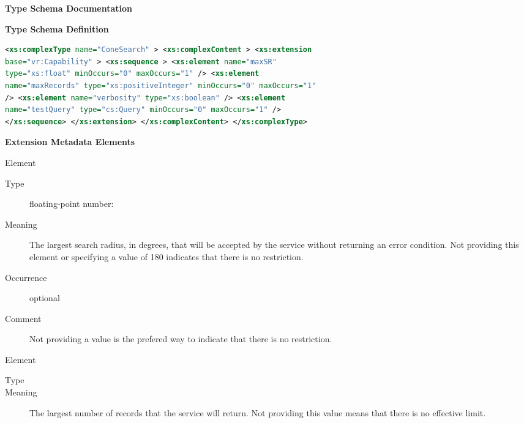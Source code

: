 \documentclass[11pt,a4paper]{ivoa} 
\begin{document}
\begin{generated} \begingroup \renewcommand*{}\vspace{2ex}\noindent\textbf{
Type Schema Documentation}


\vspace{1ex}\noindent\textbf{ Type Schema
Definition}

\begin{lstlisting}[language=XML,basicstyle=\footnotesize]
<xs:complexType name="ConeSearch" > <xs:complexContent > <xs:extension
base="vr:Capability" > <xs:sequence > <xs:element name="maxSR"
type="xs:float" minOccurs="0" maxOccurs="1" /> <xs:element
name="maxRecords" type="xs:positiveInteger" minOccurs="0" maxOccurs="1"
/> <xs:element name="verbosity" type="xs:boolean" /> <xs:element
name="testQuery" type="cs:Query" minOccurs="0" maxOccurs="1" />
</xs:sequence> </xs:extension> </xs:complexContent> </xs:complexType>
\end{lstlisting}

\vspace{0.5ex}\noindent\textbf{ Extension Metadata
Elements}

\begingroup\small\begin{bigdescription}\item[Element \xmlel{maxSR}]
\begin{description} \item[Type] floating-point number: 
\item[Meaning] The largest search radius, in degrees, that will be
accepted by the service without returning an error condition.  Not
providing this element or specifying a value of 180 indicates that there
is no restriction.
                     
\item[Occurrence] optional \item[Comment] Not providing a value is the
prefered way to indicate that there is no restriction. 
                     

\end{description} \item[Element \xmlel{maxRecords}] \begin{description}
\item[Type]  \item[Meaning] The largest number
of records that the service will return.  Not providing this value means
that there is no effective limit.  
                     

\end{description}
\end{bigdescription}
\end{generated}
\end{document}
